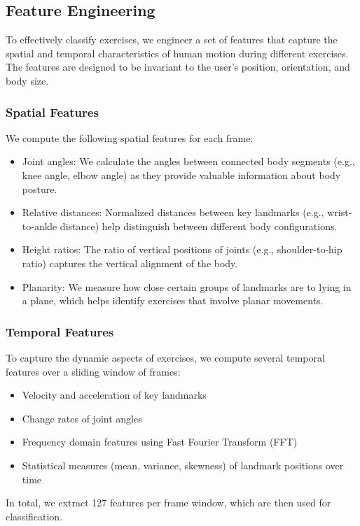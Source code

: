 \documentclass[conference]{IEEEtran}
\begin{document}
\subsection{Feature Engineering}
To effectively classify exercises, we engineer a set of features that capture the spatial and temporal characteristics of human motion during different exercises. The features are designed to be invariant to the user's position, orientation, and body size.

\subsubsection{Spatial Features}
We compute the following spatial features for each frame:
\begin{itemize}
    \item Joint angles: We calculate the angles between connected body segments (e.g., knee angle, elbow angle) as they provide valuable information about body posture.
    \item Relative distances: Normalized distances between key landmarks (e.g., wrist-to-ankle distance) help distinguish between different body configurations.
    \item Height ratios: The ratio of vertical positions of joints (e.g., shoulder-to-hip ratio) captures the vertical alignment of the body.
    \item Planarity: We measure how close certain groups of landmarks are to lying in a plane, which helps identify exercises that involve planar movements.
\end{itemize}

\subsubsection{Temporal Features}
To capture the dynamic aspects of exercises, we compute several temporal features over a sliding window of frames:
\begin{itemize}
    \item Velocity and acceleration of key landmarks
    \item Change rates of joint angles
    \item Frequency domain features using Fast Fourier Transform (FFT)
    \item Statistical measures (mean, variance, skewness) of landmark positions over time
\end{itemize}

In total, we extract 127 features per frame window, which are then used for classification.
\end{document}
